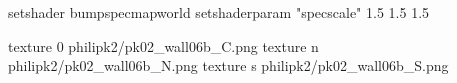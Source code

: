 setshader bumpspecmapworld
setshaderparam "specscale" 1.5 1.5 1.5

texture 0 philipk2/pk02_wall06b_C.png
texture n philipk2/pk02_wall06b_N.png
texture s philipk2/pk02_wall06b_S.png

